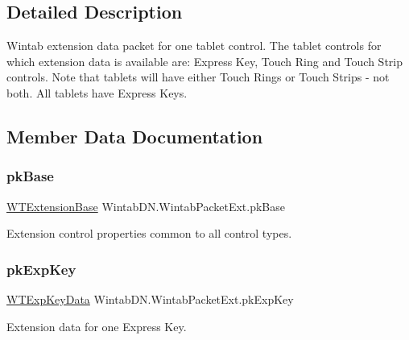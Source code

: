 \subsection{Detailed Description}
Wintab extension data packet for one tablet control. The tablet controls for which extension data is available are\+: Express Key, Touch Ring and Touch Strip controls. Note that tablets will have either Touch Rings or Touch Strips -\/ not both. All tablets have Express Keys. 



\subsection{Member Data Documentation}
\mbox{\label{struct_wintab_d_n_1_1_wintab_packet_ext_af836dcde9fde108fc13c835eeef56468}} 
\subsubsection{\texorpdfstring{pk\+Base}{pkBase}}
{\footnotesize\ttfamily \mbox{\hyperlink{struct_wintab_d_n_1_1_w_t_extension_base}{W\+T\+Extension\+Base}} Wintab\+D\+N.\+Wintab\+Packet\+Ext.\+pk\+Base}



Extension control properties common to all control types. 

\mbox{\label{struct_wintab_d_n_1_1_wintab_packet_ext_ab6450d462add690f1d84f0d4d0e71967}} 
\subsubsection{\texorpdfstring{pk\+Exp\+Key}{pkExpKey}}
{\footnotesize\ttfamily \mbox{\hyperlink{struct_wintab_d_n_1_1_w_t_exp_key_data}{W\+T\+Exp\+Key\+Data}} Wintab\+D\+N.\+Wintab\+Packet\+Ext.\+pk\+Exp\+Key}



Extension data for one Express Key. 

